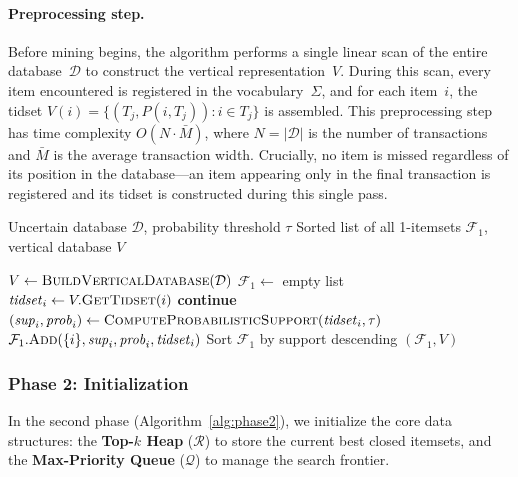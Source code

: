 \documentclass[10pt,letterpaper]{article}
\begin{document}
\paragraph{Preprocessing step.}
Before mining begins, the algorithm performs a single linear scan of the entire database~$\mathcal{D}$ to construct the vertical representation~$V$. During this scan, every item encountered is registered in the vocabulary~$\Sigma$, and for each item~$i$, the tidset $V(i) = \{(T_j, P(i, T_j)) : i \in T_j\}$ is assembled. This preprocessing step has time complexity $O(N \cdot \bar{M})$, where $N = |\mathcal{D}|$ is the number of transactions and $\bar{M}$ is the average transaction width. Crucially, no item is missed regardless of its position in the database---an item appearing only in the final transaction is registered and its tidset is constructed during this single pass.



\begin{algorithm}[H]
\caption{Phase 1: Preprocessing}
\label{alg:phase1}
\begin{algorithmic}[1]
\footnotesize
\REQUIRE Uncertain database $\mathcal{D}$, probability threshold $\tau$
\ENSURE Sorted list of all 1-itemsets $\mathcal{F}_1$, vertical database $V$

\STATE $V \leftarrow \textsc{BuildVerticalDatabase}(\mathcal{D})$
\STATE $\mathcal{F}_1 \leftarrow$ empty list
    \STATE $\mathit{tidset}_i \leftarrow V.\textsc{GetTidset}(i)$
     \STATE \textbf{continue} \ENDIF
    \STATE $(\mathit{sup}_i, \mathit{prob}_i) \leftarrow \textsc{ComputeProbabilisticSupport}(\mathit{tidset}_i, \tau)$
    \STATE $\mathcal{F}_1.\textsc{Add}(\{i\}, \mathit{sup}_i, \mathit{prob}_i, \mathit{tidset}_i)$
\ENDFOR
\STATE Sort $\mathcal{F}_1$ by support descending
\RETURN $(\mathcal{F}_1, V)$
\end{algorithmic}
\end{algorithm}


\subsubsection*{Phase 2: Initialization}
In the second phase (Algorithm~\ref{alg:phase2}), we initialize the core data structures: the \textbf{Top-$k$ Heap} ($\mathcal{R}$) to store the current best closed itemsets, and the \textbf{Max-Priority Queue} ($\mathcal{Q}$) to manage the search frontier. 
\end{document}
